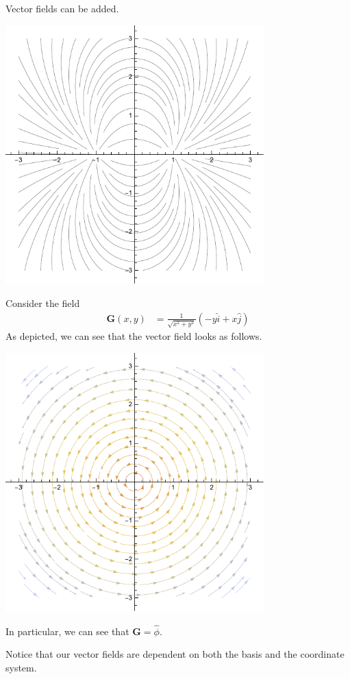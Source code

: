 \documentclass[10pt]{mypackage}
\begin{document}
\begin{example}
  Vector fields can be added.
  \begin{center}
    \includegraphics[width=10cm]{images/dipoles.pdf}
  \end{center}
\end{example}
\begin{example}
  Consider the field
  \begin{align*}
    \mathbf{G}\left(x,y\right) &= \frac{1}{\sqrt{x^2 + y^2}}\left(-y\widehat{i} + x\widehat{j}\right)
  \end{align*}
  As depicted, we can see that the vector field looks as follows.
  \begin{center}
    \includegraphics[width=10cm]{images/phihat_field.pdf}
  \end{center}
  In particular, we can see that $\mathbf{G} = \widehat{\phi}$.
\end{example}
Notice that our vector fields are dependent on both the basis and the coordinate system.\newline
\end{document}
